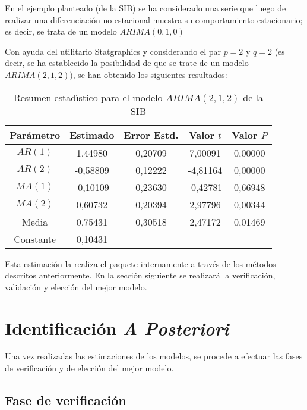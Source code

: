 \begin{ejemplo}
En el ejemplo planteado (de la SIB) se ha considerado 
una serie que luego de realizar una diferenciaci\'{o}n no estacional muestra 
su comportamiento estacionario; es decir, se trata de un modelo 
$ARIMA(0,1,0)$

Con ayuda del utilitario Statgraphics y considerando el par $p=2$ y  $q=2$ (es decir, se ha establecido la posibilidad de que se trate de un modelo $ARIMA(2,1,2))$, se han obtenido los siguientes resultados:

\begin{table}[H]
\centering\small
\caption{Resumen estad\'{\i}stico para el modelo $ARIMA(2,1,2)$ de la SIB}
\begin{tabular}{@{}ccccc@{}}
\toprule
Par\'{a}metro& Estimado& Error Estd.& Valor $t$& Valor $P$ \\
\midrule
$AR(1)$& 1,44980& 0,20709& 7,00091& 0,00000 \\
$AR(2)$& -0,58809& 0,12222& -4,81164& 0,00000 \\
$MA(1)$& -0,10109& 0,23630& -0,42781& 0,66948 \\
$MA(2)$& 0,60732& 0,20394& 2,97796& 0,00344 \\
Media& 0,75431& 0,30518& 2,47172& 0,01469 \\
Constante& 0,10431& & &  \\
\bottomrule
\end{tabular}
\end{table}

\end{ejemplo}




Esta estimaci\'{o}n la realiza el paquete internamente a trav\'{e}s de los 
m\'{e}todos descritos anteriormente. En la secci\'{o}n siguiente se 
realizar\'{a} la verificaci\'{o}n, validaci\'{o}n y elecci\'{o}n del mejor 
modelo.

\section{Identificaci\'{o}n \emph{A Posteriori}}

Una vez realizadas las estimaciones de los modelos, se procede a efectuar las 
fases de verificaci\'{o}n y de elecci\'{o}n del mejor modelo.

\subsection{Fase de verificaci\'{o}n}

